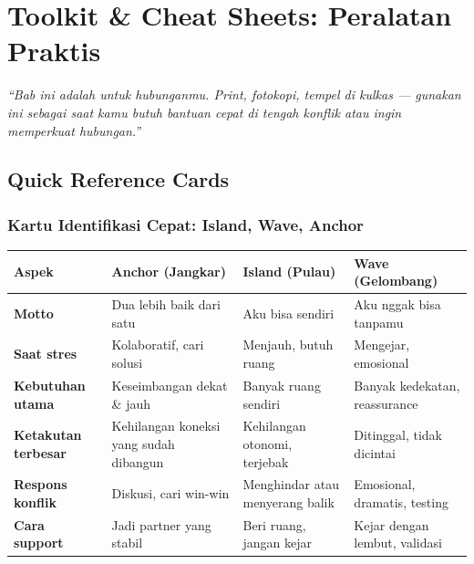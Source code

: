 \chapter{Toolkit \& Cheat Sheets: Peralatan Praktis}

\begin{insightbox}
\textit{``Bab ini adalah  untuk hubunganmu. Print, fotokopi, tempel di kulkas --- gunakan ini sebagai  saat kamu butuh bantuan cepat di tengah konflik atau ingin memperkuat hubungan.''}
\end{insightbox}

\section{Quick Reference Cards}

\subsection{Kartu Identifikasi Cepat: Island, Wave, Anchor}

\begin{center}
\renewcommand{\arraystretch}{1.5}
\begin{tabular}{|>{\raggedright}p{2.5cm}|>{\raggedright}p{4.2cm}|>{\raggedright}p{4.2cm}|>{\raggedright\arraybackslash}p{4.2cm}|}
\hline
\rowcolor{primary!20}
\textbf{Aspek} & \textbf{Anchor (Jangkar)} & \textbf{Island (Pulau)} & \textbf{Wave (Gelombang)} \\
\hline
\textbf{Motto} & Dua lebih baik dari satu & Aku bisa sendiri & Aku nggak bisa tanpamu \\
\hline
\textbf{Saat stres} & Kolaboratif, cari solusi & Menjauh, butuh ruang & Mengejar, emosional \\
\hline
\textbf{Kebutuhan utama} & Keseimbangan dekat \& jauh & Banyak ruang sendiri & Banyak kedekatan, reassurance \\
\hline
\textbf{Ketakutan terbesar} & Kehilangan koneksi yang sudah dibangun & Kehilangan otonomi, terjebak & Ditinggal, tidak dicintai \\
\hline
\textbf{Respons konflik} & Diskusi, cari win-win & Menghindar atau menyerang balik & Emosional, dramatis, testing \\
\hline
\textbf{Cara support} & Jadi partner yang stabil & Beri ruang, jangan kejar & Kejar dengan lembut, validasi \\
\hline
\end{tabular}
\end{center}

